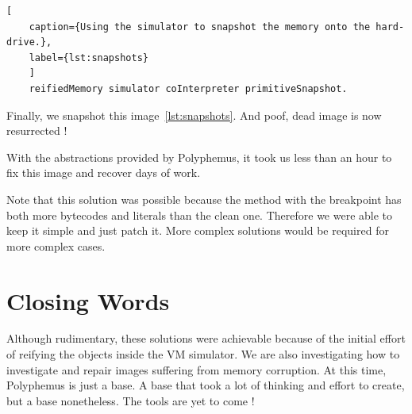 \documentclass{article}
\begin{document}
\begin{lstlisting}[
    caption={Using the simulator to snapshot the memory onto the hard-drive.},
    label={lst:snapshots}
    ]
    reifiedMemory simulator coInterpreter primitiveSnapshot.
\end{lstlisting}

Finally, we snapshot this image~\ref{lst:snapshots}.
And poof, dead image is now resurrected !

With the abstractions provided by Polyphemus, it took us less than an hour to fix this image and recover days of work.

Note that this solution was possible because the method with the breakpoint has both more bytecodes and literals than the clean one.
Therefore we were able to keep it simple and just patch it.
More complex solutions would be required for more complex cases.


\section{Closing Words}

Although rudimentary, these solutions were achievable because of the initial effort of reifying the objects inside the VM simulator.
We are also investigating how to investigate and repair images suffering from memory corruption.
At this time, Polyphemus is just a base.
A base that took a lot of thinking and effort to create, but a base nonetheless.
The tools are yet to come !
\end{document}
